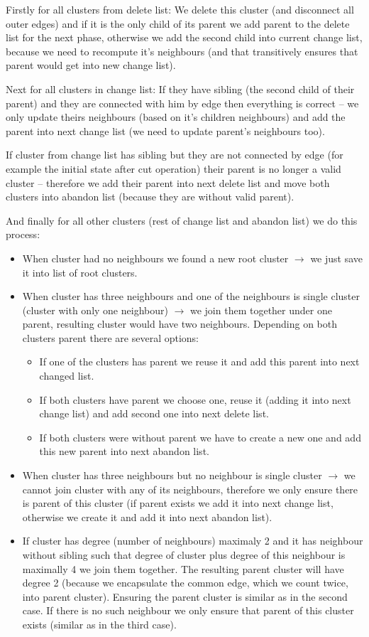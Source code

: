 Firstly for all clusters from delete list: We delete this cluster (and
disconnect all outer edges) and if it is the only child of its parent we add
parent to the delete list for the next phase, otherwise we add the second child
into current change list, because we need to recompute it's neighbours (and
that transitively ensures that parent would get into new change list).

Next for all clusters in change list: If they have sibling (the second child of
their parent) and they are connected with him by edge then everything is correct
-- we only update theirs neighbours (based on it's children neighbours) and add
the parent into next change list (we need to update parent's neighbours too).

If cluster from change list has sibling but they are not connected by edge (for
example the initial state after cut operation) their parent is no longer a
valid cluster -- therefore we add their parent into next delete list and move
both clusters into abandon list (because they are without valid parent).

And finally for all other clusters (rest of change list and abandon list) we do
this process:
\begin{itemize}
\item When cluster had no neighbours we found a new root cluster
$\rightarrow$ we just save it into list of root clusters.
\item When cluster has three neighbours and one of the neighbours is {\I single
cluster} (cluster with only one neighbour) $\rightarrow$ we join them together
under one parent, resulting cluster would have two neighbours. Depending on both
clusters parent there are several options:
	\begin{itemize}
	\item If one of the clusters has parent we reuse it and add this parent
	into next changed list.
	\item If both clusters have parent we choose one, reuse it (adding it
	into next change list) and add second one into next delete list.
	\item If both clusters were without parent we have to create a new one
	and add this new parent into next abandon list.
	\end{itemize}
\item When cluster has three neighbours but no neighbour is single cluster
$\rightarrow$ we cannot join cluster with any of its neighbours, therefore we
only ensure there is parent of this cluster (if parent exists we add it into
next change list, otherwise we create it and add it into next abandon list).
\item If cluster has degree (number of neighbours) maximaly 2 and it has
neighbour without sibling such that degree of cluster plus degree of this
neighbour is maximally 4 we join them together. The resulting parent cluster
will have degree 2 (because we encapsulate the common edge, which we count
twice, into parent cluster). Ensuring the parent cluster is similar as in the
second case. If there is no such neighbour we only ensure that parent of this cluster exists
(similar as in the third case).
\end{itemize}

